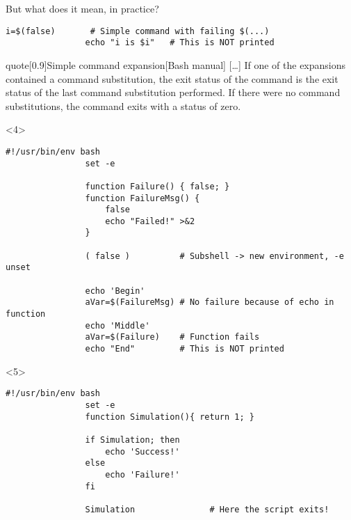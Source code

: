 \begin{frame}[fragile]{But what does it mean, in practice?}
\begin{overlayarea}{\textwidth}{0.7\textheight}
\begin{onlyenv}
\begin{lstlisting}[style=myBash]
                i=$(false)       # Simple command with failing $(...)
                echo "i is $i"   # This is NOT printed
            \end{lstlisting}
            \footnotesize
            \begin{varblock}{quote}[0.9\textwidth]{Simple command expansion}[Bash manual]
                \scriptsize[\ldots]
                If one of the expansions contained a command substitution, the exit status of the command is the exit status of the last command substitution performed.
                If there were no command substitutions, the command exits with a status of zero.
            \end{varblock}
        \end{onlyenv}
        \begin{onlyenv}<4>
            \begin{lstlisting}[style=myBash]
                #!/usr/bin/env bash
                set -e

                function Failure() { false; }
                function FailureMsg() {
                    false
                    echo "Failed!" >&2
                }

                ( false )          # Subshell -> new environment, -e unset

                echo 'Begin'
                aVar=$(FailureMsg) # No failure because of echo in function
                echo 'Middle'
                aVar=$(Failure)    # Function fails
                echo "End"         # This is NOT printed
            \end{lstlisting}
        \end{onlyenv}
        \begin{onlyenv}<5>
            \begin{lstlisting}[style=myBash]
                #!/usr/bin/env bash
                set -e
                function Simulation(){ return 1; }

                if Simulation; then
                    echo 'Success!'
                else
                    echo 'Failure!'
                fi

                Simulation               # Here the script exits!


\end{lstlisting}
\end{onlyenv}
\end{overlayarea}
\end{frame}
